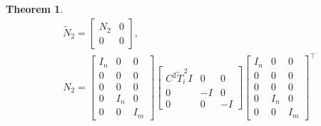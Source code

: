 \documentclass[letterpaper, 10 pt, conference]{ieeeconf}
\newtheorem{theorem}{Theorem}
\begin{document}
\begin{theorem}
\begin{align*}
    &\widetilde{N}_2 = 
    \begin{bmatrix}
N_2 & 0\\
0   & 0
\end{bmatrix},\\
    & N_2 = \begin{bmatrix}
I_n & 0 & 0\\
0 & 0 &0 \\
0 & 0 & 0\\
0 & I_n & 0\\
0 & 0 & I_m
\end{bmatrix} \begin{bmatrix}
C^2 \widetilde T_i^{\,2} I & 0 & 0\\
0 & -I & 0\\
0 & 0 & -I
\end{bmatrix}\begin{bmatrix}
I_n & 0 & 0\\
0 & 0 &0 \\
0 & 0 & 0\\
0 & I_n & 0\\
0 & 0 & I_m
\end{bmatrix}^\top
\end{align*}
\end{theorem}
\end{document}
